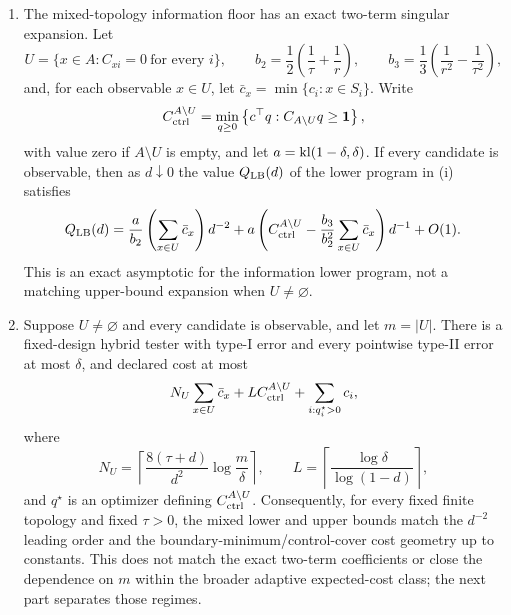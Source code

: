 \begin{theorem}
\begin{enumerate}[label=(\roman*)]
\item The mixed-topology information floor has an exact two-term singular
expansion.  Let
\[
U=\{x\in A:C_{xi}=0\ \text{for every }i\},
\qquad
b_2=\frac12\left(\frac1\tau+\frac1r\right),
\qquad
b_3=\frac13\left(\frac1{r^2}-\frac1{\tau^2}\right),
\]
and, for each observable \(x\in U\), let
\(\bar c_x=\min\{c_i:x\in S_i\}\).  Write
\[
C_{\rm ctrl}^{A\setminus U}
=
\min_{q\ge0}
\left\{
c^\top q:C_{A\setminus U}q\ge\mathbf 1
\right\},
\]
with value zero if \(A\setminus U\) is empty, and let
\(a=\mathrm{kl}(1-\delta,\delta)\).  If every candidate is observable, then as
\(d\downarrow0\) the value \(Q_{\rm LB}(d)\) of the lower program in (i)
satisfies
\[
Q_{\rm LB}(d)
=
\frac{a}{b_2}
\left(\sum_{x\in U}\bar c_x\right)d^{-2}
+
a\left(
C_{\rm ctrl}^{A\setminus U}
-\frac{b_3}{b_2^2}\sum_{x\in U}\bar c_x
\right)d^{-1}
+O(1).
\]
This is an exact asymptotic for the information lower program, not a matching
upper-bound expansion when \(U\ne\varnothing\).

\item Suppose \(U\ne\varnothing\) and every candidate is observable, and let
\(m=|U|\).  There is a fixed-design hybrid tester with type-I error and every
pointwise type-II error at most \(\delta\), and declared cost at most
\[
N_U\sum_{x\in U}\bar c_x
+L C_{\rm ctrl}^{A\setminus U}
+\sum_{i:q_i^\star>0}c_i,
\]
where
\[
N_U=
\left\lceil
\frac{8(\tau+d)}{d^2}\log\frac{m}{\delta}
\right\rceil,
\qquad
L=\left\lceil\frac{\log\delta}{\log(1-d)}\right\rceil,
\]
and \(q^\star\) is an optimizer defining
\(C_{\rm ctrl}^{A\setminus U}\).  Consequently, for every fixed finite
topology and fixed \(\tau>0\), the mixed lower and upper bounds match the
\(d^{-2}\) leading order and the boundary-minimum/control-cover cost geometry
up to constants.  This does not match the exact two-term coefficients or close
the dependence on \(m\) within the broader adaptive expected-cost class; the
next part separates those regimes.


\end{enumerate}
\end{theorem}
